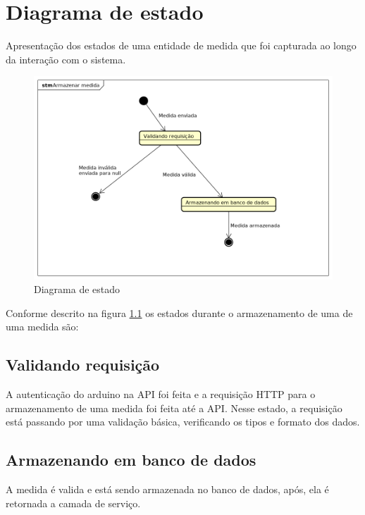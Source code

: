 \chapter{Diagrama de estado}

Apresentação dos estados de uma entidade de medida que foi capturada ao longo da interação com o sistema.

\begin{figure}[H]
    \label{figure_diagrama_estado}
    \centering
    \caption{Diagrama de estado}
    \includegraphics[scale=0.6]{diagrams/estado.png}
    \hfill
\end{figure}

Conforme descrito na figura \ref{figure_diagrama_estado} os estados durante o armazenamento de uma de uma medida são:

\section{Validando requisição}

A autenticação do arduino na API foi feita e a requisição HTTP para o armazenamento de uma medida foi feita até a API.
Nesse estado, a requisição está passando por uma validação básica, verificando os tipos e formato dos dados.

\section{Armazenando em banco de dados}

A medida é valida e está sendo armazenada no banco de dados, após, ela é retornada a camada de serviço.
